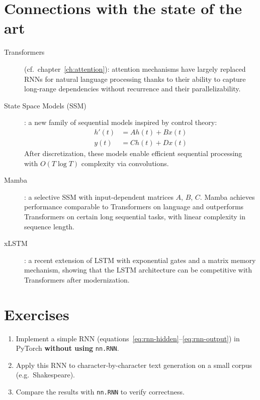 \section{Connections with the state of the art}
\label{sec:rnn-sota}

\begin{sota}[title=\textbf{Beyond classical RNNs}]
\begin{description}
  \item[Transformers] (cf.\ chapter~\ref{ch:attention}): attention mechanisms
    have largely replaced RNNs for natural language processing thanks to their
    ability to capture long-range dependencies without recurrence and their
    parallelizability.

  \item[State Space Models (SSM)]: a new family of sequential models inspired
    by control theory:
    \begin{align}
      h'(t) &= A h(t) + B x(t) \\
      y(t) &= C h(t) + D x(t)
    \end{align}
    After discretization, these models enable efficient sequential processing
    with $O(T \log T)$ complexity via convolutions.

  \item[Mamba] \cite{gu2024mamba}: a selective SSM with input-dependent
    matrices $A$, $B$, $C$. Mamba achieves performance comparable to
    Transformers on language and outperforms Transformers on certain long
    sequential tasks, with linear complexity in sequence length.

  \item[xLSTM] \cite{beck2024xlstm}: a recent extension of LSTM with
    exponential gates and a matrix memory mechanism, showing that the LSTM
    architecture can be competitive with Transformers after modernization.
\end{description}
\end{sota}

\section{Exercises}
\label{sec:rnn-exercices}

\begin{exercise}
\begin{enumerate}
  \item Implement a simple RNN (equations~\ref{eq:rnn-hidden}--\ref{eq:rnn-output})
    in PyTorch \textbf{without using} \texttt{nn.RNN}.
  \item Apply this RNN to character-by-character text generation on a small
    corpus (e.g.\ Shakespeare).
  \item Compare the results with \texttt{nn.RNN} to verify correctness.
\end{enumerate}
\end{exercise}


